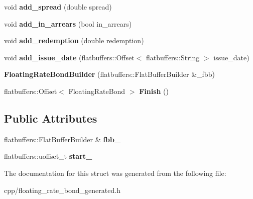 \begin{DoxyCompactItemize}
void {\bfseries add\+\_\+spread} (double spread)
\item 
\mbox{\label{structquantra_1_1FloatingRateBondBuilder_ae9f5d90bc196c30812ea4634d5e0f7c4}} 
void {\bfseries add\+\_\+in\+\_\+arrears} (bool in\+\_\+arrears)
\item 
\mbox{\label{structquantra_1_1FloatingRateBondBuilder_af228ba20947d6129769dd564b05e2763}} 
void {\bfseries add\+\_\+redemption} (double redemption)
\item 
\mbox{\label{structquantra_1_1FloatingRateBondBuilder_acc269eed75a0928a75f479ec3bdc3b5a}} 
void {\bfseries add\+\_\+issue\+\_\+date} (flatbuffers\+::\+Offset$<$ flatbuffers\+::\+String $>$ issue\+\_\+date)
\item 
\mbox{\label{structquantra_1_1FloatingRateBondBuilder_a604f625dddad6fa363fc46869531b07e}} 
{\bfseries Floating\+Rate\+Bond\+Builder} (flatbuffers\+::\+Flat\+Buffer\+Builder \&\+\_\+fbb)
\item 
\mbox{\label{structquantra_1_1FloatingRateBondBuilder_abe4770415d0f31ee551990f2a5b5d382}} 
flatbuffers\+::\+Offset$<$ Floating\+Rate\+Bond $>$ {\bfseries Finish} ()
\end{DoxyCompactItemize}
\subsection*{Public Attributes}
\begin{DoxyCompactItemize}
\item 
\mbox{\label{structquantra_1_1FloatingRateBondBuilder_a8fb3e4e9f5955523a23ddbb1666798b3}} 
flatbuffers\+::\+Flat\+Buffer\+Builder \& {\bfseries fbb\+\_\+}
\item 
\mbox{\label{structquantra_1_1FloatingRateBondBuilder_aa0aebd5016f20d37c07cb453dd9da23f}} 
flatbuffers\+::uoffset\+\_\+t {\bfseries start\+\_\+}
\end{DoxyCompactItemize}


The documentation for this struct was generated from the following file\+:\begin{DoxyCompactItemize}
\item 
cpp/floating\+\_\+rate\+\_\+bond\+\_\+generated.\+h\end{DoxyCompactItemize}
